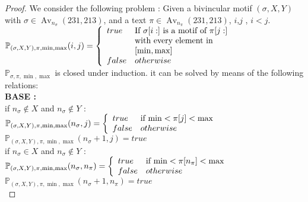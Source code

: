 \documentclass[a4paper]{llncs}
\DeclareMathOperator{\Avd}{Av}
\newcommand\Av[2]{\Avd_{{#1}}({#2})}
\newcommand{\ptext}{\pi}
\newcommand{\pmotif}{\sigma}
\newcommand{\x}{X}
\newcommand{\y}{Y}
\newcommand{\bmotif}{(\sigma,\x,\y)}
\begin{document}
			\begin{proof}
			We consider the following problem :
			Given a bivincular motif $\bmotif$ with $\pmotif \in \Av{n_\pmotif}{231,213} $, and a text $\ptext \in \Av{n_\ptext}{231,213}$, $i$,$j$ , $i<j$.\\
			
			$\mathbb{P}_{\bmotif,\ptext,\min,\max}(i,j)= \left\{ 
				\begin{array}{l l}
					true & \text{If $\pmotif[i:]$ is a motif of $\ptext[j:]$}\\
						& \text{with every element in}\\ 
						&[\min,\max]\\
		
					false & otherwise\\
				\end{array} \right.$\\
		
		
		
		
			$\mathbb{P}_{\pmotif,\ptext,\min,\max}$ is closed under induction. 
			it can be
			solved by means of the following relations:\\
			
			
			\textbf{BASE :} \\
			
			if $n_\pmotif \notin  \x $
			and $n_\pmotif \notin  \y$ : \\		
			$\mathbb{P}_{\bmotif,\ptext,\min,\max}(n_\pmotif,j)= \left\{ 
					\begin{array}{l l}
						true & \text{if $\min<\ptext[j]<\max$
						}\\
						false & otherwise\\
					\end{array} \right. $\\	
			$\mathbb{P}_{\bmotif,\ptext,\min,\max}(n_\pmotif+1,j)= true $\\
			
			if $n_\pmotif \in  \x $
			and $n_\pmotif \notin  \y$ : \\		
			$\mathbb{P}_{\bmotif,\ptext,\min,\max}(n_\pmotif,n_\ptext)= \left\{ 
					\begin{array}{l l}
						true & \text{if $\min<\ptext[n_\ptext]<\max$
						}\\
						false & otherwise\\
					\end{array} \right. $\\	
			$\mathbb{P}_{\bmotif,\ptext,\min,\max}(n_\pmotif+1,n_\ptext)= true $\\
			

\end{proof}
\end{document}
